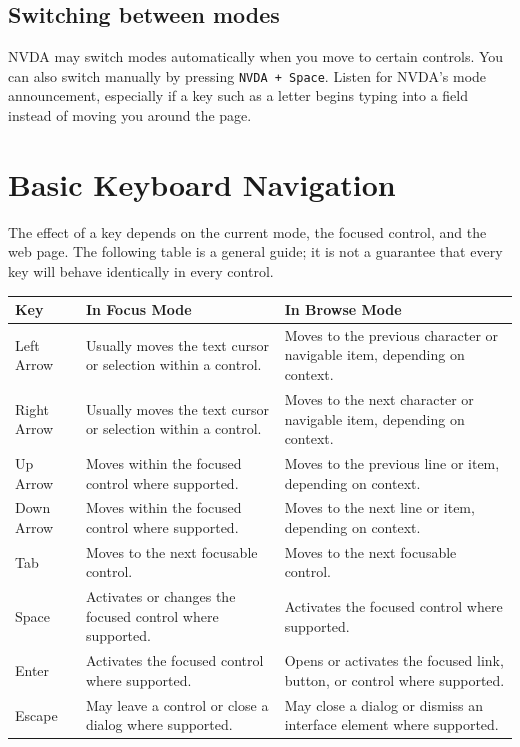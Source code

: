 \documentclass[11pt,oneside]{book}
\begin{document}
\section{Switching between modes}
NVDA may switch modes automatically when you move to certain controls. You can also switch manually by pressing \texttt{NVDA + Space}. Listen for NVDA's mode announcement, especially if a key such as a letter begins typing into a field instead of moving you around the page.

\chapter{Basic Keyboard Navigation}
The effect of a key depends on the current mode, the focused control, and the web page. The following table is a general guide; it is not a guarantee that every key will behave identically in every control.

\begin{center}
	\begin{tabular}{p{}p{}p{}}
		\toprule
		\textbf{Key} & \textbf{In Focus Mode}                                       & \textbf{In Browse Mode}                                                  \\
		\midrule
		Left Arrow   & Usually moves the text cursor or selection within a control. & Moves to the previous character or navigable item, depending on context. \\
		Right Arrow  & Usually moves the text cursor or selection within a control. & Moves to the next character or navigable item, depending on context.     \\
		Up Arrow     & Moves within the focused control where supported.            & Moves to the previous line or item, depending on context.                \\
		Down Arrow   & Moves within the focused control where supported.            & Moves to the next line or item, depending on context.                    \\
		Tab          & Moves to the next focusable control.                         & Moves to the next focusable control.                                     \\
		Space        & Activates or changes the focused control where supported.    & Activates the focused control where supported.                           \\
		Enter        & Activates the focused control where supported.               & Opens or activates the focused link, button, or control where supported. \\
		Escape       & May leave a control or close a dialog where supported.       & May close a dialog or dismiss an interface element where supported.      \\
		\bottomrule
	\end{tabular}
\end{center}
\end{document}
